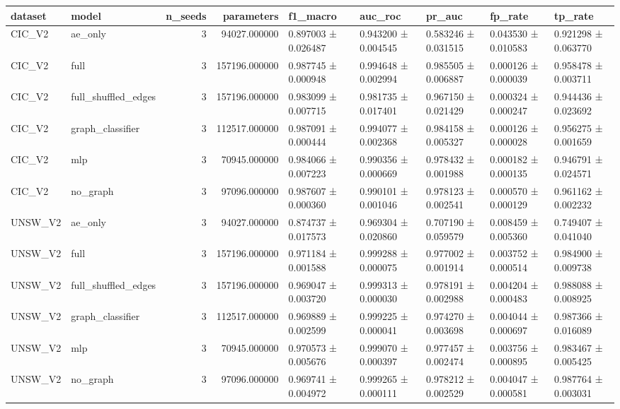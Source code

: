 \begin{tabular}{llrrlllll}
\toprule
dataset & model & n_seeds & parameters & f1_macro & auc_roc & pr_auc & fp_rate & tp_rate \\
\midrule
CIC_V2 & ae_only & 3 & 94027.000000 & 0.897003 ± 0.026487 & 0.943200 ± 0.004545 & 0.583246 ± 0.031515 & 0.043530 ± 0.010583 & 0.921298 ± 0.063770 \\
CIC_V2 & full & 3 & 157196.000000 & 0.987745 ± 0.000948 & 0.994648 ± 0.002994 & 0.985505 ± 0.006887 & 0.000126 ± 0.000039 & 0.958478 ± 0.003711 \\
CIC_V2 & full_shuffled_edges & 3 & 157196.000000 & 0.983099 ± 0.007715 & 0.981735 ± 0.017401 & 0.967150 ± 0.021429 & 0.000324 ± 0.000247 & 0.944436 ± 0.023692 \\
CIC_V2 & graph_classifier & 3 & 112517.000000 & 0.987091 ± 0.000444 & 0.994077 ± 0.002368 & 0.984158 ± 0.005327 & 0.000126 ± 0.000028 & 0.956275 ± 0.001659 \\
CIC_V2 & mlp & 3 & 70945.000000 & 0.984066 ± 0.007223 & 0.990356 ± 0.000669 & 0.978432 ± 0.001988 & 0.000182 ± 0.000135 & 0.946791 ± 0.024571 \\
CIC_V2 & no_graph & 3 & 97096.000000 & 0.987607 ± 0.000360 & 0.990101 ± 0.001046 & 0.978123 ± 0.002541 & 0.000570 ± 0.000129 & 0.961162 ± 0.002232 \\
UNSW_V2 & ae_only & 3 & 94027.000000 & 0.874737 ± 0.017573 & 0.969304 ± 0.020860 & 0.707190 ± 0.059579 & 0.008459 ± 0.005360 & 0.749407 ± 0.041040 \\
UNSW_V2 & full & 3 & 157196.000000 & 0.971184 ± 0.001588 & 0.999288 ± 0.000075 & 0.977002 ± 0.001914 & 0.003752 ± 0.000514 & 0.984900 ± 0.009738 \\
UNSW_V2 & full_shuffled_edges & 3 & 157196.000000 & 0.969047 ± 0.003720 & 0.999313 ± 0.000030 & 0.978191 ± 0.002988 & 0.004204 ± 0.000483 & 0.988088 ± 0.008925 \\
UNSW_V2 & graph_classifier & 3 & 112517.000000 & 0.969889 ± 0.002599 & 0.999225 ± 0.000041 & 0.974270 ± 0.003698 & 0.004044 ± 0.000697 & 0.987366 ± 0.016089 \\
UNSW_V2 & mlp & 3 & 70945.000000 & 0.970573 ± 0.005676 & 0.999070 ± 0.000397 & 0.977457 ± 0.002474 & 0.003756 ± 0.000895 & 0.983467 ± 0.005425 \\
UNSW_V2 & no_graph & 3 & 97096.000000 & 0.969741 ± 0.004972 & 0.999265 ± 0.000111 & 0.978212 ± 0.002529 & 0.004047 ± 0.000581 & 0.987764 ± 0.003031 \\
\bottomrule
\end{tabular}
